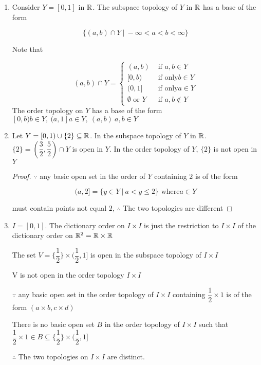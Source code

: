 \begin{enumerate}
	\item Consider $Y = [0,1]$ in $\mathbb{R}$. The subspace topology of $Y$ in $\mathbb{R}$ has a base of the form
	
	$$\{(a,b) \cap Y~|~ -\infty < a < b < \infty\}$$
	
	Note that
	
	$$(a,b) \cap Y = \begin{cases}
		(a,b) & \text{ if } a,b \in Y\\
		[0,b) & \text{ if only} b \in Y\\
		(0,1] & \text{ if only} a \in Y\\
		\emptyset \text{ or } Y & \text{ if } a,b \notin Y 
	\end{cases}$$
	The order topology on $Y$ has a base of the form $[0,b) b\in Y,~(a,1] a \in Y,~(a,b) ~ a,b \in Y$
	
	\item Let $Y = [0,1) \cup \{2\} \subseteq \mathbb{R}$. In the subspace topology of $Y$ in $\mathbb{R}$. $\{2\} = (\dfrac{3}{2},\dfrac{5}{2}) \cap Y$ is open in $Y$. In the order topology of $Y$, $\{2\}$ is not open in $Y$
	
	\begin{proof}
		$\because$ any basic open set in the order of $Y$ containing $2$ is of the form
		
		$$(a,2] = \{y \in Y ~|~ a < y \leq 2\} \text{ where} a \in Y$$
		
		must contain points not equal $2$, $\therefore$ The two topologies are different
	\end{proof} 
	\item $I = [0,1]$. The dictionary order on $I \times I$ is just the restriction to $I \times I$ of the dictionary order on $\mathbb{R}^2 = \mathbb{R} \times \mathbb{R}$
	
	The set $V = \{\dfrac{1}{2}\} \times ( \dfrac{1}{2},1 ]$ is open in the subspace topology of $I \times I$
	
	V is not open in the order topology $I \times I$
	
	$\because$ any basic open set in the order topology of $I \times I$ containing $\dfrac{1}{2} \times 1$ is of the form $(a\times b,c\times d)$
	
	There is no basic open set $B$ in the order topology of $I \times I$ such that $\dfrac{1}{2} \times 1 \in B \subseteq \{\dfrac{1}{2}\} \times (\dfrac{1}{2} , 1]$
	
	$\therefore$ The two topologies on $I \times I$ are distinct.
\end{enumerate}

